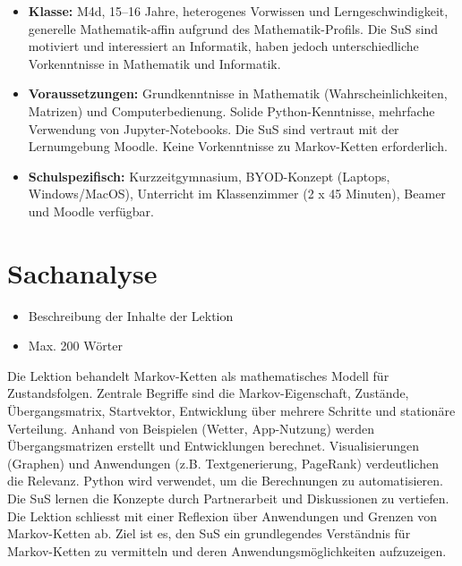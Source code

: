\begin{itemize}
    \item \textbf{Klasse:} M4d, 15--16 Jahre, heterogenes Vorwissen und Lerngeschwindigkeit, generelle Mathematik-affin aufgrund des Mathematik-Profils. Die SuS sind motiviert und interessiert an Informatik, haben jedoch unterschiedliche Vorkenntnisse in Mathematik und Informatik.
    \item \textbf{Voraussetzungen:} Grundkenntnisse in Mathematik (Wahrscheinlichkeiten, Matrizen) und Computerbedienung. Solide Python-Kenntnisse, mehrfache Verwendung von Jupyter-Notebooks. Die SuS sind vertraut mit der Lernumgebung Moodle. Keine Vorkenntnisse zu Markov-Ketten erforderlich.
    \item \textbf{Schulspezifisch:} Kurzzeitgymnasium, BYOD-Konzept (Laptops, Windows/MacOS), Unterricht im Klassenzimmer (2 x 45 Minuten), Beamer und Moodle verfügbar.
\end{itemize}

\section*{Sachanalyse}
\begin{tcolorbox}[colback=gray!10, colframe=gray!80!black, title=Anforderungen]
    \begin{itemize}
        \item Beschreibung der Inhalte der Lektion
        \item Max. 200 Wörter
    \end{itemize}
\end{tcolorbox}

Die Lektion behandelt Markov-Ketten als mathematisches Modell für Zustandsfolgen. Zentrale Begriffe sind die Markov-Eigenschaft, Zustände, Übergangsmatrix, Startvektor, Entwicklung über mehrere Schritte und stationäre Verteilung. Anhand von Beispielen (Wetter, App-Nutzung) werden Übergangsmatrizen erstellt und Entwicklungen berechnet. Visualisierungen (Graphen) und Anwendungen (z.B. Textgenerierung, PageRank) verdeutlichen die Relevanz. Python wird verwendet, um die Berechnungen zu automatisieren. Die SuS lernen die Konzepte durch Partnerarbeit und Diskussionen zu vertiefen. Die Lektion schliesst mit einer Reflexion über Anwendungen und Grenzen von Markov-Ketten ab. Ziel ist es, den SuS ein grundlegendes Verständnis für Markov-Ketten zu vermitteln und deren Anwendungsmöglichkeiten aufzuzeigen.

